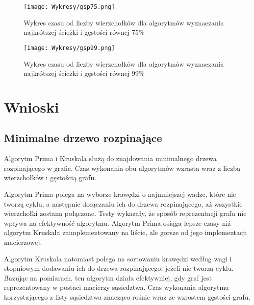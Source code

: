 \documentclass{article}
\begin{document}
            \begin{figure}[H]
                \centering
                \texttt{[image: Wykresy/gsp75.png]}
                \caption{Wykres czasu od liczby wierzchołków dla algorytmów wyznaczania najkrótszej ścieżki i gęstości równej 75\%}
            \end{figure}

            \begin{figure}[H]
                \centering
                \texttt{[image: Wykresy/gsp99.png]}
                \caption{Wykres czasu od liczby wierzchołków dla algorytmów wyznaczania najkrótszej ścieżki i gęstości równej 99\%}
            \end{figure}

\section{Wnioski}


    \subsection{Minimalne drzewo rozpinające}
        Algorytm Prima i Kruskala służą do znajdowania minimalnego drzewa rozpinającego w grafie. 
        Czas wykonania obu algorytmów wzrasta wraz z liczbą wierzchołków i gęstością grafu.

        Algorytm Prima polega na wyborze krawędzi o najmniejszej wadze, które nie tworzą cyklu, 
        a następnie dołączaniu ich do drzewa rozpinającego, aż wszystkie wierzchołki zostaną połączone.
        Testy wykazały, że sposób reprezentacji grafu nie wpływa na efektywność algorytmu. Algorytm Prima osiąga lepsze czasy niż algorytm Kruskala zaimplementowany na 
        liście, ale gorsze od jego implementacji macierzowej.

        Algorytm Kruskala natomiast polega na sortowaniu krawędzi według wagi i stopniowym dodawaniu ich do drzewa rozpinającego, jeżeli nie tworzą cyklu. 
        Bazując na pomiarach, ten algorytm działa efektywniej, gdy graf jest reprezentowany w postaci macierzy sąsiedztwa.
        Czas wykonania algorytmu korzystającego z listy sąsiedztwa znacząco rośnie wraz ze wzrostem gęstości grafu.
\end{document}
